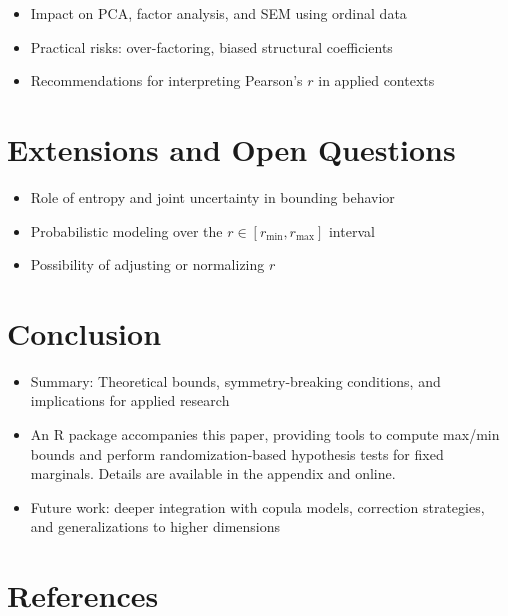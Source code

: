 \documentclass[
  12pt,
]{article}
\providecommand{\tightlist}{%
  \setlength{\itemsep}{0pt}\setlength{\parskip}{0pt}}\usepackage{longtable,booktabs,array}
\begin{document}
\begin{itemize}
\tightlist
\item
  Impact on PCA, factor analysis, and SEM using ordinal data\\
\item
  Practical risks: over-factoring, biased structural coefficients\\
\item
  Recommendations for interpreting Pearson's \(r\) in applied contexts
\end{itemize}

\section{Extensions and Open
Questions}\label{extensions-and-open-questions}

\begin{itemize}
\tightlist
\item
  Role of entropy and joint uncertainty in bounding behavior\\
\item
  Probabilistic modeling over the \(r \in [r_{\min}, r_{\max}]\)
  interval\\
\item
  Possibility of adjusting or normalizing \(r\)
\end{itemize}

\section{Conclusion}\label{conclusion}

\begin{itemize}
\tightlist
\item
  Summary: Theoretical bounds, symmetry-breaking conditions, and
  implications for applied research\\
\item
  An R package accompanies this paper, providing tools to compute
  max/min bounds and perform randomization-based hypothesis tests for
  fixed marginals. Details are available in the appendix and online.\\
\item
  Future work: deeper integration with copula models, correction
  strategies, and generalizations to higher dimensions
\end{itemize}

\newpage

\section{References}\label{references}
\end{document}
